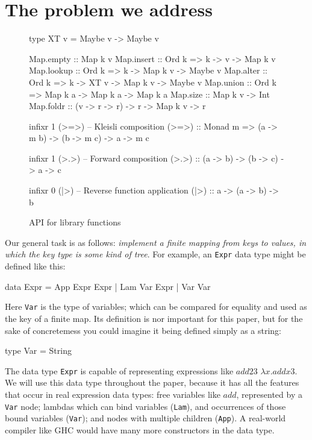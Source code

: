 \documentclass[acmsmall]{acmart}
\theoremstyle{theorem}
\theoremstyle{definition}
\theoremstyle{remark}
\newenvironment{figurebox}{\begin{figure}}{\end{figure}}
\begin{document}
\section{The problem we address}
\begin{figurebox}
\begin{code}
type XT v = Maybe v -> Maybe v

Map.empty  :: Map k v
Map.insert :: Ord k => k -> v -> Map k v
Map.lookup :: Ord k => k -> Map k v -> Maybe v
Map.alter  :: Ord k => k -> XT v -> Map k v -> Maybe v
Map.union  :: Ord k => Map k a -> Map k a -> Map k a
Map.size   :: Map k v -> Int
Map.foldr  :: (v -> r -> r) -> r -> Map k v -> r


infixr 1 (>=>)  -- Kleisli composition
(>=>) :: Monad m => (a -> m b) -> (b -> m c) -> a -> m c

infixr 1 (>.>)   -- Forward composition
(>.>)  :: (a -> b) -> (b -> c) -> a -> c

infixr 0 (|>)   -- Reverse function application
(|>)  :: a -> (a -> b) -> b
\end{code}
\caption{API for library functions}
\label{fig:containers} \label{fig:library}
\end{figurebox}

Our general task is as follows: \emph{implement a finite mapping from keys to values,
in which the key type is some kind of tree}.
For example, an \lstinline{Expr} data type might be defined like this:
\begin{code}
data Expr = App Expr Expr | Lam  Var Expr | Var Var
\end{code}
Here \lstinline{Var} is the type of variables; which can be compared for
equality and used as the key of a finite map.  Its definition is nor important
for this paper, but for the sake of concretemess
you could imagine it being defined simply as a string:
\begin{code}
  type Var = String
\end{code}
The data type \lstinline{Expr} is capable of representing expressions like $add 2 3$
$\lambda x. add x 3$.  We will use this data type throughout the paper, because it
has all the features that occur in real expression data types: free variables like $add$, represented by a \lstinline{Var} node;
lambdas which can bind variables (\lstinline{Lam}), and occurrences of those bound variables (\lstinline{Var}); 
and nodes with multiple children (\lstinline{App}).  A real-world compiler like GHC would have
many more constructors in the data type.
\end{document}
